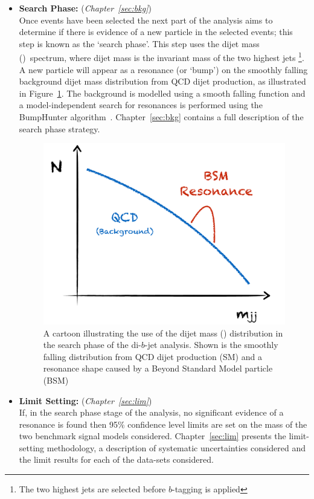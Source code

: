 \begin{itemize}[leftmargin=*]
\item\textbf{Search Phase:} (\textit{Chapter~\ref{sec:bkg}})\\
  Once events have been selected the next part of the analysis aims to determine if there
  is evidence of a new particle in the selected events; this step is known as the `search phase'.
  This step uses the dijet mass (\mjj)~spectrum, where dijet mass is the invariant mass of the two highest \pT{} jets
  \footnote{The two highest \pT{} jets are selected before $b$-tagging is applied}.
  A new particle will appear as a resonance (or `bump') on the smoothly falling background
  dijet mass distribution from QCD dijet production, as illustrated in Figure~\ref{fig:evt-dijet_schem}.
  The background is modelled using a smooth falling function and a
  model-independent search for resonances is performed using the {\sc BumpHunter} algorithm~\cite{dibjet-bh}.
  Chapter~\ref{sec:bkg} contains a full description of the search phase strategy.
  \vspace{-2mm}
  \begin{figure}[!hbt]
  \begin{center}
    \includegraphics[width=0.6\linewidth, angle=0]{figs/Dibjet/Gen/dijet_schem.pdf}
  \end{center}
  \vspace{-3mm}
  \caption{A cartoon illustrating the use of the dijet mass (\mjj) distribution in the search phase of the di-$b$-jet analysis.
            Shown is the smoothly falling distribution from QCD dijet production (SM)
            and a resonance shape caused by a Beyond Standard Model particle (BSM)}
          \label{fig:evt-dijet_schem}
  \end{figure}
  \vspace{-5mm}
 
\item\textbf{Limit Setting:} (\textit{Chapter~\ref{sec:lim}})\\
  If, in the search phase stage of the analysis, no significant evidence of a resonance is found
  then 95\% confidence level limits are set on the mass of the two benchmark signal models considered.
  Chapter~\ref{sec:lim} presents the limit-setting methodology,
  a description of systematic uncertainties considered
  and the limit results for each of the data-sets considered.

\end{itemize}

